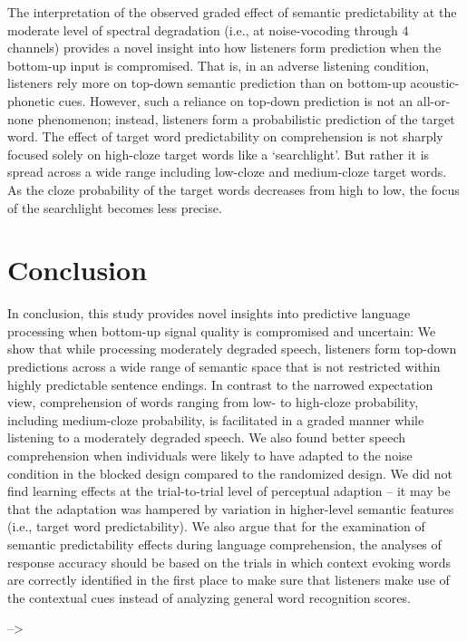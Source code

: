 \documentclass[a4paper, nobind]{templates/ociamthesis}
\begin{document}
The interpretation of the observed graded effect of semantic predictability at the moderate level of spectral degradation (i.e., at noise-vocoding through 4 channels) provides a novel insight into how listeners form prediction when the bottom-up input is compromised.
That is, in an adverse listening condition, listeners rely more on top-down semantic prediction than on bottom-up acoustic-phonetic cues.
However, such a reliance on top-down prediction is not an all-or-none phenomenon; instead, listeners form a probabilistic prediction of the target word.
The effect of target word predictability on comprehension is not sharply focused solely on high-cloze target words like a `searchlight'.
But rather it is spread across a wide range including low-cloze and medium-cloze target words. As the cloze probability of the target words decreases from high to low, the focus of the searchlight becomes less precise.

\hypertarget{conclusion}{%
\section{Conclusion}\label{conclusion}}

In conclusion, this study provides novel insights into predictive language processing when bottom-up signal quality is compromised and uncertain:
We show that while processing moderately degraded speech, listeners form top-down predictions across a wide range of semantic space that is not restricted within highly predictable sentence endings.
In contrast to the narrowed expectation view, comprehension of words ranging from low- to high-cloze probability, including medium-cloze probability, is facilitated in a graded manner while listening to a moderately degraded speech.
We also found better speech comprehension when individuals were likely to have adapted to the noise condition in the blocked design compared to the randomized design.
We did not find learning effects at the trial-to-trial level of perceptual adaption -- it may be that the adaptation was hampered by variation in higher-level semantic features (i.e., target word predictability).
We also argue that for the examination of semantic predictability effects during language comprehension, the analyses of response accuracy should be based on the trials in which context evoking words are correctly identified in the first place to make sure that listeners make use of the contextual cues instead of analyzing general word recognition scores.

--\textgreater{}
\end{document}
